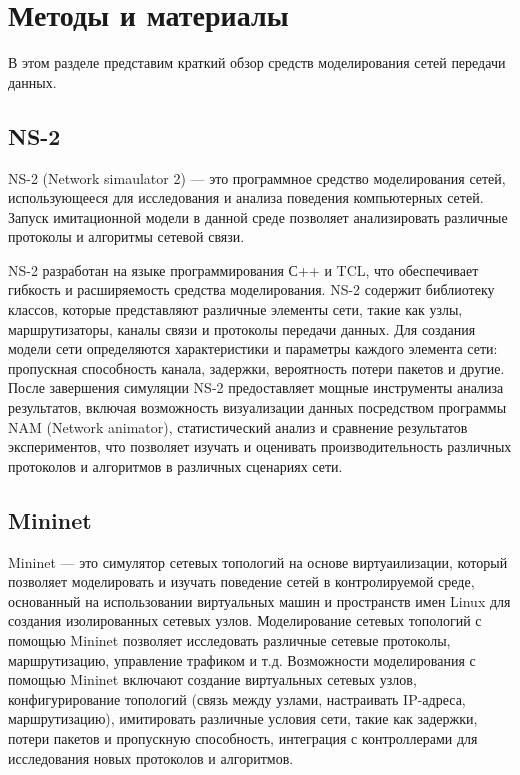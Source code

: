 \chapter{Методы и материалы}

В этом разделе представим краткий обзор средств моделирования сетей
передачи данных.

\section{NS-2}
NS-2 (Network simaulator 2) — это программное средство моделирования
сетей, использующееся для исследования и анализа поведения
компьютерных сетей.  Запуск имитационной модели в данной среде
позволяет анализировать различные протоколы и алгоритмы сетевой связи.

NS-2 разработан на языке программирования С++ и TCL, что обеспечивает
гибкость и расширяемость средства моделирования.  NS-2 содержит
библиотеку классов, которые представляют различные элементы сети,
такие как узлы, маршрутизаторы, каналы связи и протоколы передачи
данных. Для создания модели сети определяются характеристики и
параметры каждого элемента сети: пропускная способность канала,
задержки, вероятность потери пакетов и другие. После завершения
симуляции NS-2 предоставляет мощные инструменты анализа результатов,
включая возможность визуализации данных посредством программы NAM
(Network animator), статистический анализ и сравнение результатов
экспериментов, что позволяет изучать и оценивать производительность
различных протоколов и алгоритмов в различных сценариях
сети.

\section{Mininet}

Mininet — это симулятор сетевых топологий на основе виртуаилизации,
который позволяет моделировать и изучать поведение сетей в
контролируемой среде, основанный на использовании виртуальных машин и
пространств имен Linux для создания изолированных сетевых
узлов. Моделирование сетевых топологий с помощью Mininet позволяет
исследовать различные сетевые протоколы, маршрутизацию, управление
трафиком и т.д. Возможности моделирования с помощью Mininet включают
создание виртуальных сетевых узлов, конфигурирование топологий (связь
между узлами, настраивать IP-адреса, маршрутизацию), имитировать
различные условия сети, такие как задержки, потери пакетов и
пропускную способность, интеграция с контроллерами для исследования
новых протоколов и алгоритмов.

